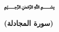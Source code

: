 \thispagestyle{empty}
\begin{huge}
	\begin{center}
		\bfseries
		﷽\\
		\vspace{15pt}
		\quranayah[58][11][19]
	\end{center}
	\vspace{10pt}
	\begin{flushleft}
		\textbf{(سورة المجادلة)}
	\end{flushleft}
\end{huge}









